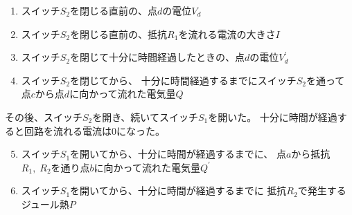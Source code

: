 \documentclass[12pt,b5paper]{ltjsarticle}
\begin{document}
\dotfill
\begin{enumerate}
 \item スイッチ$S_{2}$を閉じる直前の、点$d$の電位$V_{d}$
 \item スイッチ$S_{2}$を閉じる直前の、抵抗$R_{1}$を流れる電流の大きさ$I$
 \item スイッチ$S_{2}$を閉じて十分に時間経過したときの、点$d$の電位$V_{d}^{\prime}$
 \item スイッチ$S_{2}$を閉じてから、
       十分に時間経過するまでにスイッチ$S_{2}$を通って
       点$c$から点$d$に向かって流れた電気量$Q$
\end{enumerate}

その後、スイッチ$S_{2}$を開き、続いてスイッチ$S_{1}$を開いた。
十分に時間が経過すると回路を流れる電流は0になった。

\begin{enumerate}\setcounter{enumi}{4}
 \item スイッチ$S_{1}$を開いてから、十分に時間が経過するまでに、
       点$a$から抵抗$R_{1},\;R_{2}$を通り点$b$に向かって流れた電気量$Q^{\prime}$
 \item スイッチ$S_{1}$を開いてから、十分に時間が経過するまでに
       抵抗$R_{2}$で発生するジュール熱$P$
\end{enumerate}


\hrulefill
\end{document}
